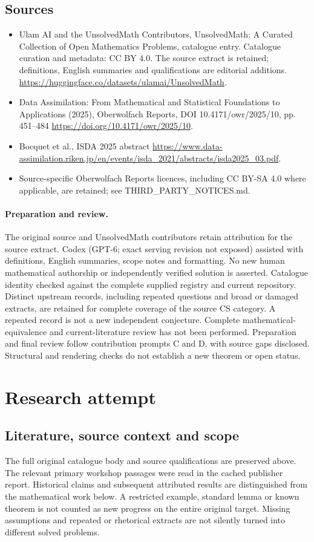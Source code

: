 \documentclass[11pt]{article}
\begin{document}
\subsection{Sources}
\begin{itemize}
\item[S1] Ulam AI and the UnsolvedMath Contributors, UnsolvedMath: A Curated Collection of Open Mathematics Problems, catalogue entry. Catalogue curation and metadata: CC BY 4.0. The source extract is retained; definitions, English summaries and qualifications are editorial additions.
\url{https://huggingface.co/datasets/ulamai/UnsolvedMath}.
\item[S2] Data Assimilation: From Mathematical and Statistical Foundations to Applications (2025), Oberwolfach Reports, DOI 10.4171/owr/2025/10, pp. 451--484
\url{https://doi.org/10.4171/owr/2025/10}.
\item[S3] Bocquet et al., ISDA 2025 abstract
\url{https://www.data-assimilation.riken.jp/en/events/isda_2021/abstracts/isda2025_03.pdf}.
\item Source-specific Oberwolfach Reports licences, including CC BY-SA 4.0 where applicable, are retained; see THIRD\_PARTY\_NOTICES.md.
\end{itemize}
\paragraph{Preparation and review.}
The original source and UnsolvedMath contributors retain attribution for the source extract. Codex (GPT-6; exact serving revision not exposed) assisted with definitions, English summaries, scope notes and formatting. No new human mathematical authorship or independently verified solution is asserted. Catalogue identity checked against the complete supplied registry and current repository. Distinct upstream records, including repeated questions and broad or damaged extracts, are retained for complete coverage of the source CS category. A repeated record is not a new independent conjecture. Complete mathematical-equivalence and current-literature review has not been performed. Preparation and final review follow contribution prompts C and D, with source gaps disclosed. Structural and rendering checks do not establish a new theorem or open status.
\label{end:statement}

\section{Research attempt}
\subsection{Literature, source context and scope}
The full original catalogue body and source qualifications are preserved above. The relevant primary workshop passages were read in the cached publisher report. Historical claims and subsequent attributed results are distinguished from the mathematical work below. A restricted example, standard lemma or known theorem is not counted as new progress on the entire original target. Missing assumptions and repeated or rhetorical extracts are not silently turned into different solved problems.
\end{document}
